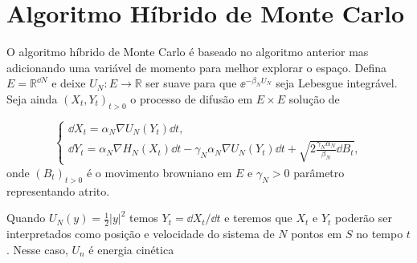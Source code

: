
\section{Algoritmo Híbrido de Monte Carlo}

O algoritmo híbrido de Monte Carlo é baseado no algoritmo anterior mas adicionando uma variável de momento para melhor explorar o espaço. Defina $E = \mathbb{R}^{\dd N}$ e deixe $U_N : E \rightarrow \mathbb{R}$ ser suave para que $\ee^{-\beta_N U_N}$ seja Lebesgue integrável. Seja ainda $(X_t, Y_t)_{t>0}$ o processo de difusão em $E \times E$ solução de

\[
\begin{cases}
	\dd X_t = \alpha_N \nabla U_N (Y_t) \dd t, \\
	\dd Y_t = \alpha_N \nabla H_N(X_t) \dd t - \gamma_N \alpha_N \nabla U_N(Y_t) \dd t + \sqrt{2\frac{\gamma_N \alpha_N}{\beta_N} \dd B_t},
\end{cases}
\]
onde $(B_t)_{t>0}$ é o movimento browniano em $E$ e $\gamma_N > 0$ parâmetro representando atrito.

Quando $U_N(y) = \frac{1}{2}|y|^2$ temos $Y_t = \dd X_t/\dd t$ e teremos que $X_t$ e $Y_t$ poderão ser interpretados como posição e velocidade do sistema de $N$ pontos em $S$ no tempo $t$. Nesse caso, $U_n$ é energia cinética